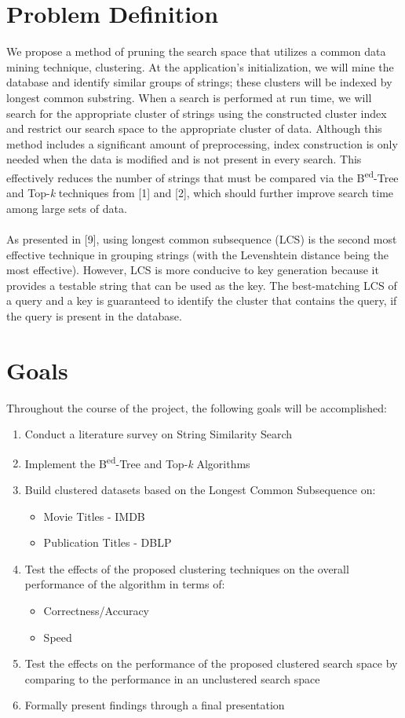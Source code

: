 \documentclass[pdftex,12pt,letter]{article}
\begin{document}
\section{Problem Definition}
We propose a method of pruning the search space that utilizes a common data mining technique, clustering. At the application's initialization, we will mine the database and identify similar groups of strings; these clusters will be indexed by longest common substring. When a search is performed at run time, we will search for the appropriate cluster of strings using the constructed cluster index and restrict our search space to the appropriate cluster of data. Although this method includes a significant amount of preprocessing, index construction is only needed when the data is modified and is not present in every search. This effectively reduces the number of strings that must be compared via the B\textsuperscript{ed}-Tree and Top-\textit{k} techniques from [1] and [2], which should further improve search time among large sets of data.\\
\\
As presented in [9], using longest common subsequence (LCS) is the second most effective technique in grouping strings (with the Levenshtein distance being the most effective). However, LCS is more conducive to key generation because it provides a testable string that can be used as the key. The best-matching LCS of a query and a key is guaranteed to identify the cluster that contains the query, if the query is present in the database. \\

\section{Goals}
Throughout the course of the project, the following goals will be accomplished:
\begin{enumerate}
\item Conduct a literature survey on String Similarity Search
\item Implement the B\textsuperscript{ed}-Tree and Top-\textit{k} Algorithms
\item Build clustered datasets based on the Longest Common Subsequence on:
\begin{itemize}
\item Movie Titles - IMDB
\item Publication Titles - DBLP
\end{itemize}
\item Test the effects of the proposed clustering techniques on the overall performance of the algorithm in terms of:
\begin{itemize}
\item Correctness/Accuracy
\item Speed
\end{itemize}
\item Test the effects on the performance of the proposed clustered search space by comparing to the performance in an unclustered search space
\item Formally present findings through a final presentation
\end{enumerate}
\end{document}
